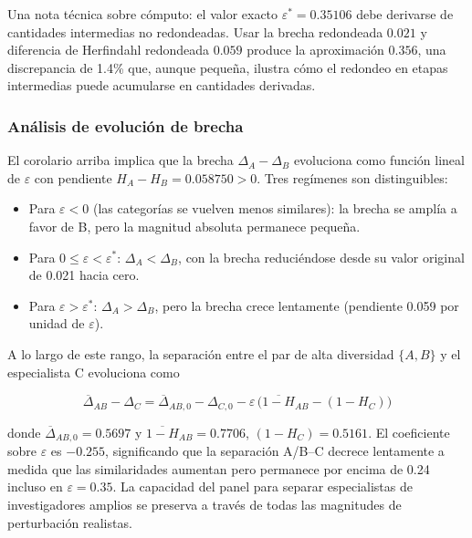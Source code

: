 \documentclass[
]{article}
\providecommand{\tightlist}{%
  \setlength{\itemsep}{0pt}\setlength{\parskip}{0pt}}
\begin{document}
Una nota técnica sobre cómputo: el valor exacto
\(\varepsilon^* = 0.35106\) debe derivarse de cantidades intermedias no
redondeadas. Usar la brecha redondeada \(0.021\) y diferencia de
Herfindahl redondeada \(0.059\) produce la aproximación \(0.356\), una
discrepancia de 1.4\% que, aunque pequeña, ilustra cómo el redondeo en
etapas intermedias puede acumularse en cantidades derivadas.

\hypertarget{anuxe1lisis-de-evoluciuxf3n-de-brecha}{%
\subsubsection{Análisis de evolución de
brecha}\label{anuxe1lisis-de-evoluciuxf3n-de-brecha}}

El corolario arriba implica que la brecha \(\Delta_A - \Delta_B\)
evoluciona como función lineal de \(\varepsilon\) con pendiente
\(H_A - H_B = 0.058750 > 0\). Tres regímenes son distinguibles:

\begin{itemize}
\tightlist
\item
  Para \(\varepsilon < 0\) (las categorías se vuelven menos similares):
  la brecha se amplía a favor de B, pero la magnitud absoluta permanece
  pequeña.
\item
  Para \(0 \le \varepsilon < \varepsilon^*\): \(\Delta_A < \Delta_B\),
  con la brecha reduciéndose desde su valor original de 0.021 hacia
  cero.
\item
  Para \(\varepsilon > \varepsilon^*\): \(\Delta_A > \Delta_B\), pero la
  brecha crece lentamente (pendiente 0.059 por unidad de
  \(\varepsilon\)).
\end{itemize}

A lo largo de este rango, la separación entre el par de alta diversidad
\(\{A, B\}\) y el especialista C evoluciona como

\[\overline{\Delta}_{AB} - \Delta_C = \overline{\Delta}_{AB,0} - \Delta_{C,0}
  - \varepsilon\,\bigl(\overline{1-H}_{AB} - (1-H_C)\bigr)\]

donde \(\overline{\Delta}_{AB,0} = 0.5697\) y
\(\overline{1-H}_{AB} = 0.7706\), \((1-H_C) = 0.5161\). El coeficiente
sobre \(\varepsilon\) es \(-0.255\), significando que la separación
A/B--C decrece lentamente a medida que las similaridades aumentan pero
permanece por encima de 0.24 incluso en \(\varepsilon = 0.35\). La
capacidad del panel para separar especialistas de investigadores amplios
se preserva a través de todas las magnitudes de perturbación realistas.
\end{document}
